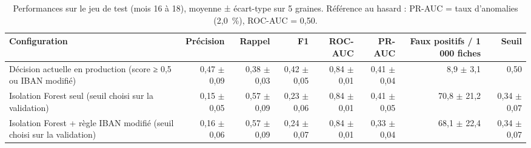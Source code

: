 \begin{table}[htbp]
\centering
\caption{Performances sur le jeu de test (mois 16 à 18), moyenne ± écart-type sur 5 graines. Référence au hasard : PR-AUC = taux d'anomalies (2,0~\%), ROC-AUC = 0,50.}
\label{tab:performances_test}
\small
\begin{tabular}{p{4.6cm}rrrrrrr}
\toprule
\textbf{Configuration} & \textbf{Précision} & \textbf{Rappel} & \textbf{F1} & \textbf{ROC-AUC} & \textbf{PR-AUC} & \textbf{Faux positifs / 1 000 fiches} & \textbf{Seuil} \\
\midrule
Décision actuelle en production (score ≥ 0,5 ou IBAN modifié) & 0,47 $\pm$ 0,09 & 0,38 $\pm$ 0,03 & 0,42 $\pm$ 0,05 & 0,84 $\pm$ 0,01 & 0,41 $\pm$ 0,04 & 8,9 $\pm$ 3,1 & 0,50 \\
Isolation Forest seul (seuil choisi sur la validation) & 0,15 $\pm$ 0,05 & 0,57 $\pm$ 0,09 & 0,23 $\pm$ 0,06 & 0,84 $\pm$ 0,01 & 0,41 $\pm$ 0,05 & 70,8 $\pm$ 21,2 & 0,34 $\pm$ 0,07 \\
Isolation Forest + règle IBAN modifié (seuil choisi sur la validation) & 0,16 $\pm$ 0,06 & 0,57 $\pm$ 0,09 & 0,24 $\pm$ 0,07 & 0,84 $\pm$ 0,01 & 0,33 $\pm$ 0,04 & 68,1 $\pm$ 22,4 & 0,34 $\pm$ 0,07 \\
\bottomrule
\end{tabular}
\end{table}
